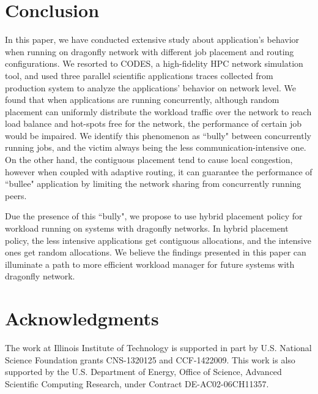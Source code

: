 \documentclass[conference,compsoc]{IEEEtran}
\begin{document}
\section{Conclusion}
\label{sec:conclusion}

In this paper, we have conducted extensive study about application's behavior when running on dragonfly network with different job placement and routing configurations. We resorted to CODES, a high-fidelity HPC network simulation tool, and used three parallel scientific applications traces collected from production system to analyze the applications' behavior on network level. We found that when applications are running concurrently, although random placement can uniformly distribute the workload traffic over the network to reach load balance and hot-spots free for the network, the performance of certain job would be impaired. We identify this phenomenon as ``bully" between concurrently running jobs, and the victim always being the less communication-intensive one. On the other hand, the contiguous placement tend to cause local congestion, however when coupled with adaptive routing, it can guarantee the performance of ``bullee" application by limiting the network sharing from concurrently running peers. 

Due the presence of this ``bully", we propose to use hybrid placement policy for workload running on systems with dragonfly networks. In hybrid placement policy, the less intensive applications get contiguous allocations, and the intensive ones get random allocations. We believe the findings presented in this paper can illuminate a path to more efficient workload manager for future systems with dragonfly network.






\ifCLASSOPTIONcompsoc
  \section*{Acknowledgments}
\else
\fi


The work at Illinois Institute of Technology is supported in part by U.S. National Science Foundation grants CNS-1320125 and CCF-1422009. This work is also supported by the U.S. Department of Energy, Office of Science, Advanced Scientific Computing Research, under Contract DE-AC02-06CH11357.
\end{document}
